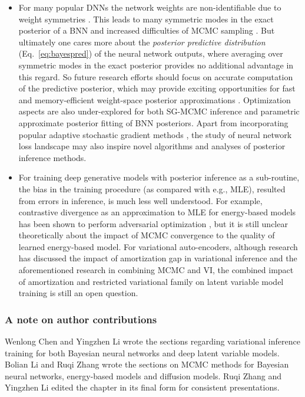 \vspace{-1em}
\begin{itemize}
    \item For many popular DNNs the network weights are non-identifiable due to weight symmetries \citep{chen1993geometry,phuong2020functional}. This leads to many symmetric modes in the exact posterior of a BNN and increased difficulties of MCMC sampling \citep{papamarkou2022challenges,izmailov2021bayesian}. But ultimately one cares more about the \emph{posterior predictive distribution} (Eq.~\ref{eq:bayespred}) of the neural network outputs, where averaging over symmetric modes in the exact posterior provides no additional advantage in this regard. So future research efforts should focus on accurate computation of the predictive posterior, which may provide exciting opportunities for fast and memory-efficient weight-space posterior approximations \citep{sun2019functional,ma2019variational,ritter2021sparse}. Optimization aspects are also under-explored for both SG-MCMC inference and parametric approximate posterior fitting of BNN posteriors. Apart from incorporating popular adaptive stochastic gradient methods \citep{li2016preconditioned,chen2016bridging}, the study of neural network loss landscape \citep{li2018visualizing,maddox2019simple} may also inspire novel algorithms and analyses of posterior inference methods. 

    \item For training deep generative models with posterior inference as a sub-routine, the bias in the training procedure (as compared with e.g., MLE), resulted from errors in inference, is much less well understood. For example, contrastive divergence \citep{hinton2002training} as an approximation to MLE for energy-based models has been shown to perform adversarial optimization \citep{yair2021contrastive}, but it is still unclear theoretically about the impact of MCMC convergence to the quality of learned energy-based model. For variational auto-encoders, although research has discussed the impact of amortization gap \citep{cremer2018inference,marino2018iterative} in variational inference and the aforementioned research in combining MCMC and VI, the combined impact of amortization and restricted variational family on latent variable model training is still an open question.

\end{itemize}


\subsubsection*{A note on author contributions}
Wenlong Chen and Yingzhen Li wrote the sections regarding variational inference training for both Bayesian neural networks and deep latent variable models. Bolian Li and Ruqi Zhang wrote the sections on MCMC methods for Bayesian neural networks, energy-based models and diffusion models. Ruqi Zhang and Yingzhen Li edited the chapter in its final form for consistent presentations.